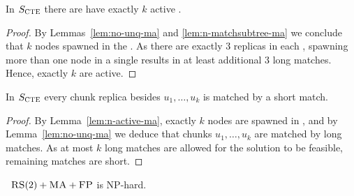 \begin{lemma}
  In $S_{\mathrm{\textsc{CTE}}}$ there are have exactly $k$ active \TripleGadgets{}.
  \label{lem:n-active-ma}
\end{lemma}
\begin{proof}
  By Lemmas~\ref{lem:no-unq-ma} and \ref{lem:n-matchsubtree-ma} we conclude that $k$ nodes spawned in the \TripleGadgets.
As there are exactly $3$ replicas in each \TripleGadget{}, spawning more than one node in a single \TripleGadget{} results in at least additional $3$ long matches.
Hence, exactly $k$ \TripleGadgets{} are active.
\end{proof}

\begin{lemma}
  In $S_{\mathrm{\textsc{CTE}}}$ every chunk replica besides $u_1, \ldots, u_k$ is matched by a short match.
  \label{lem:short-ma}
\end{lemma}
\begin{proof}
  By Lemma~\ref{lem:n-active-ma}, exactly $k$ nodes are spawned in \TripleGadgets{}, and by Lemma~\ref{lem:no-unq-ma} we deduce that chunks $u_1, \ldots, u_k$ are matched by long matches.
  As at most $k$ long matches are allowed for the solution to be feasible, remaining matches are short.
\end{proof}

\begin{theorem}
  ~$\textsc{RS}(2)+\textsc{MA}+\textsc{FP}$ is NP-hard.
  \label{th:ma-reduction}
\end{theorem}

